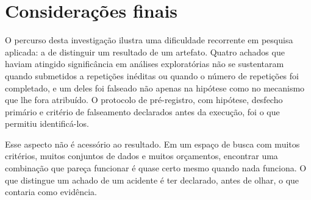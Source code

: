 \section{Considerações finais}

O percurso desta investigação ilustra uma dificuldade recorrente em pesquisa aplicada: a de distinguir um resultado de um artefato. Quatro achados que haviam atingido significância em análises exploratórias não se sustentaram quando submetidos a repetições inéditas ou quando o número de repetições foi completado, e um deles foi falseado não apenas na hipótese como no mecanismo que lhe fora atribuído. O protocolo de pré-registro, com hipótese, desfecho primário e critério de falseamento declarados antes da execução, foi o que permitiu identificá-los.

Esse aspecto não é acessório ao resultado. Em um espaço de busca com muitos critérios, muitos conjuntos de dados e muitos orçamentos, encontrar uma combinação que pareça funcionar é quase certo mesmo quando nada funciona. O que distingue um achado de um acidente é ter declarado, antes de olhar, o que contaria como evidência.
